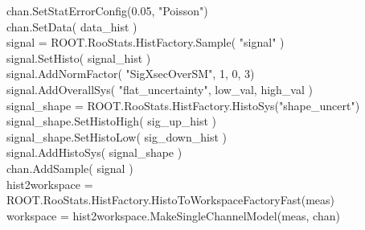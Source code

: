 \documentclass[landscape,a1paper,fontscale=0.5]{baposter} %
\begin{document}
\begin{poster}
{\begin{multicols}{2}
\begin{tcolorbox}
{chan.SetStatErrorConfig(0.05, "Poisson")\\
chan.SetData( data\_hist )\\
signal = ROOT.RooStats.HistFactory.Sample( "signal" )\\
signal.SetHisto( signal\_hist )\\
signal.AddNormFactor( "SigXsecOverSM", 1, 0, 3)\\
signal.AddOverallSys( "flat\_uncertainty",  low\_val, high\_val )\\
signal\_shape = ROOT.RooStats.HistFactory.HistoSys("shape\_uncert")\\
signal\_shape.SetHistoHigh( sig\_up\_hist )\\
signal\_shape.SetHistoLow( sig\_down\_hist )\\
signal.AddHistoSys( signal\_shape )\\
chan.AddSample( signal )\\
hist2workspace =\\
\hspace*{1.5cm}ROOT.RooStats.HistFactory.HistoToWorkspaceFactoryFast(meas)\\
workspace = hist2workspace.MakeSingleChannelModel(meas, chan)
}
\end{tcolorbox}
\end{multicols}
}



\end{poster}
\end{document}
